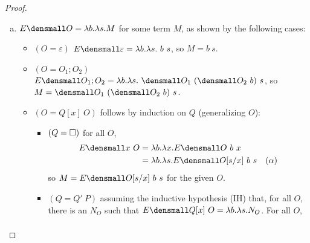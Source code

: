\begin{proof}
\begin{enumerate}[(a)]
\begin{itemize}
    \end{itemize}
  \item $E\den{O} = \lambda b. \lambda s. M$ for some term $M$, as shown by the following cases: 
    \begin{itemize}
    \item $(O = \varepsilon)$
      $E\den{\varepsilon} = \lambda b. \lambda s. ~b ~s$, so $M= b ~s$.
    \item $(O = O_1;O_2)$
      $E\den{O_1;O_2} = \lambda b. \lambda s. ~\den{O_1} ~(\den{O_2} ~b) ~s$, so $M = \den{O_1} ~(\den{O_2} ~b) ~s$.
    \item $(O = Q[x] ~O)$ follows by induction on $Q$ (generalizing $O$):
      \begin{itemize}
      \item $(Q=\square)$ for all $O$,
        \begin{align*}
          E\den{x ~O}
          &=
          \lambda b. \lambda x. E\den{O} ~ b ~ x
          \\
          &=
          \lambda b. \lambda s. E\den{O}\subst{x}{s} ~ b ~ s
          &(\alpha)
        \end{align*}
        so $M = E\den{O}\subst{x}{s} ~ b ~ s$ for the given $O$.
      \item $(Q=Q'~P)$
        assuming the inductive hypothesis (IH) that, for all $O$, there is an $N_O$ such that $E\den{Q[x] ~ O} = \lambda b. \lambda s. N_O$.
        For all $O$,
        \begin{align*}

\end{align*}
\end{itemize}
\end{itemize}
\end{enumerate}
\end{proof}
